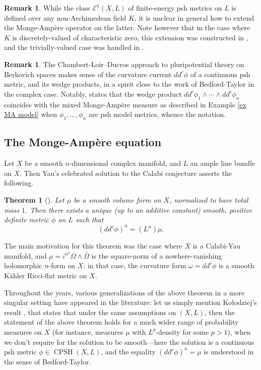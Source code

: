 \documentclass[JEP,XML,SOM,Unicode,published]{cedram}
\newtheorem{theo}[equation]{Theorem}
\theoremstyle{definition}
\newtheorem{rem}[equation]{Remark}
\DeclareMathOperator{\CPSH}{CPSH}
\begin{document}
\begin{rem}
While the class $\mathcal{E}^1(X, L)$ of finite-energy psh metrics on $L$ is \hbox{defined} over any non-Archimedean field $K$, it is unclear in general how to extend the Monge-Ampère operator on the latter. Note however that in the case where $K$ is discretely-valued of characteristic zero, this extension was constructed in \cite{BFJ2}, and the trivially-valued case was handled in \cite{BJv4}.
\end{rem}
\begin{rem} The Chambert-Loir--Ducros \cite{CLD} approach to pluripotential theory on Berkovich spaces makes sense of the curvature current $dd^c \phi$ of a continuous psh metric, and its wedge products, in a spirit close to the work of Bedford-Taylor in the complex case. Notably, \cite[Th.\,6.9.3]{CLD} states that the wedge product $dd^c\phi_1 \wedge\cdots \wedge dd^c \phi_n$ coincides with the mixed Monge-Ampère measure as described in Example \ref{ex MA model} when $\phi_1,\dots,\phi_n$ are psh model metrics, whence the notation.
\end{rem}
\subsection{The Monge-Ampère equation}
Let $X$ be a smooth $n$-dimensional complex manifold, and $L$ an ample line bundle on $X$. Then Yau's celebrated solution to the Calabi conjecture asserts the following.
\begin{theo}[{\cite{Y}}] Let $\mu$ be a smooth volume form on $X$, normalized to have total mass $1$. Then there exists a unique (up to an additive constant) smooth, positive definite metric $\phi$ on $L$ such that
\[
(dd^c \phi)^n = (L^n) \mu.
\]
\end{theo}
The main motivation for this theorem was the case where $X$ is a Calabi-Yau manifold, and $\mu = i^{n^2} \Omega \wedge \bar{\Omega}$ is the square-norm of a nowhere-vanishing holomorphic $n$-form on $X$: in that case, the curvature form $\omega = dd^c \phi$ is a smooth Kähler Ricci-flat metric on $X$.

Throughout the years, various generalizations of the above theorem in a more singular setting have appeared in the literature: let us simply mention Kołodziej's result \cite{Kolo}, that states that under the same assumptions on $(X, L)$, then the statement of the above theorem holds for a much wider range of probability measures on $X$ (for instance, measures $\mu$ with $L^p$-density for some $p>1$), when we don't require for the solution to be smooth---here the solution is a continuous psh metric $\phi \in \CPSH(X, L)$, and the equality $(dd^c \phi)^n = \mu$ is understood in the sense of Bedford-Taylor.
\end{document}
